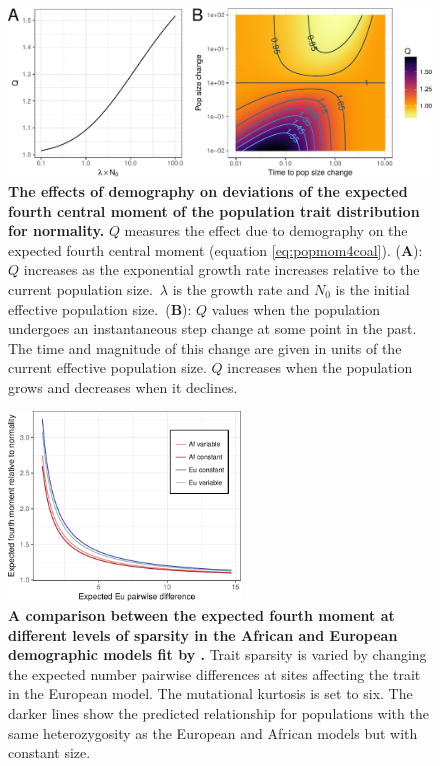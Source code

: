 \begin{figure}
\centering
\includegraphics[width=\textwidth]{./figures/combo_q.pdf}

\caption{
\textbf{The effects of demography on deviations of the expected
fourth central moment of the population trait distribution for normality.} $Q$
measures the effect due to demography on the expected fourth central moment
(equation \eqref{eq:popmom4coal}). (\textbf{A}): $Q$ increases as the
exponential growth rate increases relative to the current population
size.~$\lambda$ is the growth rate and $N_0$ is the initial effective population
size.~(\textbf{B}): $Q$ values when the population undergoes an instantaneous
step change at some point in the past. The time and magnitude of this change are
given in units of the current effective population size. $Q$ increases when the
population grows and decreases when it declines. }

\label{fig:Qexp}
\end{figure}

\begin{figure}
\centering
\includegraphics[width=0.55\textwidth]{./figures/af_eu_mom4_r.pdf}
\caption{ \textbf{A comparison between the expected fourth moment at different levels of
sparsity in the African and European demographic models fit
by \citet{Tennessen2012}.} Trait sparsity is varied by changing the expected
number pairwise differences at sites affecting the trait in the European model.
The mutational kurtosis is set to six. The darker lines show the predicted
relationship for populations with the same heterozygosity as the European and
African models but with constant size.}
\label{fig:afeucomp}
\end{figure}

